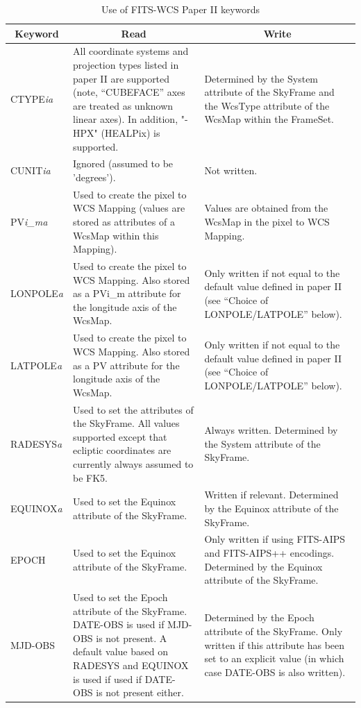 \documentclass[twoside,11pt]{article}
\newcommand{\fitskey}[3]{{#1}&{#2}&{#3}\\}
\begin{document}
\begin{table}[htbp]
\begin{tabular}{|l|p{2.5in}|p{2.5in}|}
\hline
\multicolumn{1}{|c|}{{\bf Keyword}} & \multicolumn{1}{c|}{{\bf Read}}
& \multicolumn{1}{c|}{{\bf Write}} \\ \hline

\fitskey{CTYPE\emph{ia}}{All coordinate systems and projection types
listed in paper II are supported (note, ``CUBEFACE'' axes are treated as
unknown linear axes). In addition, "-HPX" (HEALPix) is supported.}{Determined by the System attribute
of the SkyFrame and the WcsType attribute of the
WcsMap within the FrameSet.}

\fitskey{CUNIT\emph{ia}}{Ignored (assumed to be 'degrees').}{Not written.}

\fitskey{PV\emph{i\_ma}}{Used to create the pixel to WCS Mapping (values
are stored as attributes of a WcsMap within this Mapping).}{Values are
obtained from the WcsMap in the pixel to WCS Mapping.}

\fitskey{LONPOLE\emph{a}}{Used to create the pixel to WCS Mapping. Also
stored as a PVi\_m attribute for the longitude axis of the WcsMap.}{Only
written if not equal to the default value defined in paper II (see
``Choice of LONPOLE/LATPOLE'' below).}

\fitskey{LATPOLE\emph{a}}{Used to create the pixel to WCS Mapping. Also
stored as a PV attribute for the longitude axis of the WcsMap.}{Only
written if not equal to the default value defined in paper II (see
``Choice of LONPOLE/LATPOLE'' below).}

\fitskey{RADESYS\emph{a}}{Used to set the attributes of the SkyFrame. All
values supported except that ecliptic coordinates are currently always
assumed to be FK5.}{Always written. Determined by the System attribute of
the SkyFrame.}

\fitskey{EQUINOX\emph{a}}{Used to set the Equinox attribute
of the SkyFrame.}{Written if relevant. Determined by the Equinox attribute of
the SkyFrame.}

\fitskey{EPOCH}{Used to set the Equinox attribute of the SkyFrame.}{Only
written if using FITS-AIPS and FITS-AIPS++ encodings. Determined by the Equinox attribute
of the SkyFrame.}

\fitskey{MJD-OBS}{Used to set the Epoch attribute of the
SkyFrame. DATE-OBS is used if MJD-OBS is not present. A default value based on
RADESYS and EQUINOX is used if used if DATE-OBS is not present
either.}{Determined by the Epoch attribute of the SkyFrame. Only written
if this attribute has been set to an explicit value (in which case
DATE-OBS is also written).}

\hline
\end{tabular}
\vspace{3.mm}
\caption{Use of FITS-WCS Paper II keywords}
\label{tab:fitspaper2}
\end{table}
\end{document}
